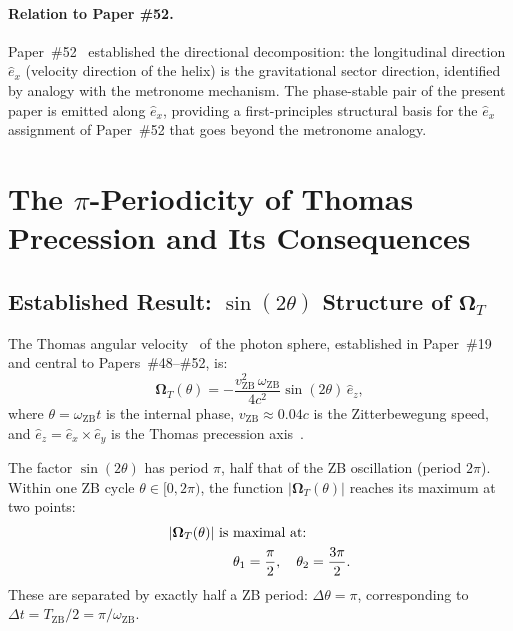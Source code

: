 \documentclass[%
 reprint, amsmath,amssymb, aps, prb, ]{revtex4-2}
\numberwithin{equation}{section}
\newcommand{\iphase}{\theta}
\newcommand{\omZB}{\omega_{\text{ZB}}}
\newcommand{\vZB}{v_{\mathrm{ZB}}}
\newcommand{\OmT}{\boldsymbol{\Omega}_T}
\newcommand{\ehat}[1]{\hat{e}_{#1}}
\begin{document}
\paragraph{Relation to Paper \#52.}
Paper~\#52~\cite{hanamura52} established the directional decomposition: the longitudinal direction $\ehat{x}$ (velocity direction of the helix) is the gravitational sector direction, identified by analogy with the metronome mechanism.
The phase-stable pair of the present paper is emitted along $\ehat{x}$, providing a first-principles structural basis for the $\ehat{x}$ assignment of Paper~\#52 that goes beyond the metronome analogy.

\section{\texorpdfstring{The $\pi$-Periodicity of Thomas Precession and Its Consequences}{The pi-Periodicity of Thomas Precession and Its Consequences}}
\label{sec:pi_period}

\subsection{\texorpdfstring{Established Result: $\sin(2\iphase)$ Structure of $\OmT$}{Established Result: sin(2theta) Structure of Omega_T}}

The Thomas angular velocity~\cite{Thomas1926,Jackson1999} of the photon sphere, established in Paper~\#19~\cite{hanamura19} and central to Papers~\#48--\#52, is:
\begin{equation}
\OmT(\iphase) = -\frac{\vZB^2\,\omZB}{4c^2}\sin(2\iphase)\,\ehat{z},
\label{eq:OmT}
\end{equation}
where $\iphase = \omZB t$ is the internal phase, $\vZB \approx 0.04c$ is the Zitterbewegung speed, and $\ehat{z} = \ehat{x}\times\ehat{y}$ is the Thomas precession axis~\cite{hanamura52}.

The factor $\sin(2\iphase)$ has period $\pi$, half that of the ZB oscillation (period $2\pi$).
Within one ZB cycle $\iphase \in [0, 2\pi)$, the function $|\OmT(\iphase)|$ reaches its maximum at two points:
\begin{align}
|\OmT(\iphase)|\ &\text{is maximal at:}
\notag\\
&\quad\iphase_1 = \frac{\pi}{2},\quad
\iphase_2 = \frac{3\pi}{2}.
\label{eq:two_maxima}
\end{align}
These are separated by exactly half a ZB period: $\Delta\iphase = \pi$, corresponding to $\Delta t = T_\mathrm{ZB}/2 = \pi/\omZB$.
\end{document}
